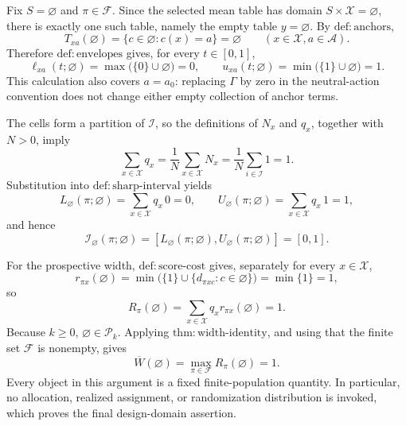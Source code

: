 Fix \(S=\varnothing\) and \(\pi\in\mathcal F\).  Since the selected mean table has domain \(S\times\mathcal X=\varnothing\), there is exactly one such table, namely the empty table \(y=\varnothing\).  By \(\mathrm{def{:}anchors}\),
\[
T_{xa}(\varnothing)=\{c\in\varnothing:c(x)=a\}=\varnothing
\qquad (x\in\mathcal X, a\in\mathcal A).
\]
Therefore \(\mathrm{def{:}envelopes}\) gives, for every \(t\in[0,1]\),
\[
\ell_{xa}(t;\varnothing)
=\max\bigl(\{0\}\cup\varnothing\bigr)=0,
\qquad
u_{xa}(t;\varnothing)
=\min\bigl(\{1\}\cup\varnothing\bigr)=1.
\]
This calculation also covers \(a=a_0\): replacing \(\Gamma\) by zero in the neutral-action convention does not change either empty collection of anchor terms.

The cells form a partition of \(\mathcal I\), so the definitions of \(N_x\) and \(q_x\), together with \(N>0\), imply
\[
\sum_{x\in\mathcal X}q_x
=\frac{1}{N}\sum_{x\in\mathcal X}N_x
=\frac{1}{N}\sum_{i\in\mathcal I}1
=1.
\]
Substitution into \(\mathrm{def{:}sharp\text{-}interval}\) yields
\[
L_{\varnothing}(\pi;\varnothing)
=\sum_{x\in\mathcal X}q_x\,0=0,
\qquad
U_{\varnothing}(\pi;\varnothing)
=\sum_{x\in\mathcal X}q_x\,1=1,
\]
and hence
\[
\mathcal I_{\varnothing}(\pi;\varnothing)
=[L_{\varnothing}(\pi;\varnothing),U_{\varnothing}(\pi;\varnothing)]
=[0,1].
\]

For the prospective width, \(\mathrm{def{:}score\text{-}cost}\) gives, separately for every \(x\in\mathcal X\),
\[
r_{\pi x}(\varnothing)
=\min\bigl(\{1\}\cup\{d_{\pi xc}:c\in\varnothing\}\bigr)
=\min\{1\}=1,
\]
so
\[
R_{\pi}(\varnothing)
=\sum_{x\in\mathcal X}q_xr_{\pi x}(\varnothing)
=1.
\]
Because \(k\geq0\), \(\varnothing\in\mathcal P_k\).  Applying \(\mathrm{thm{:}width\text{-}identity}\), and using that the finite set \(\mathcal F\) is nonempty, gives
\[
\overline W(\varnothing)
=\max_{\pi\in\mathcal F}R_{\pi}(\varnothing)
=1.
\]
Every object in this argument is a fixed finite-population quantity.  In particular, no allocation, realized assignment, or randomization distribution is invoked, which proves the final design-domain assertion.
